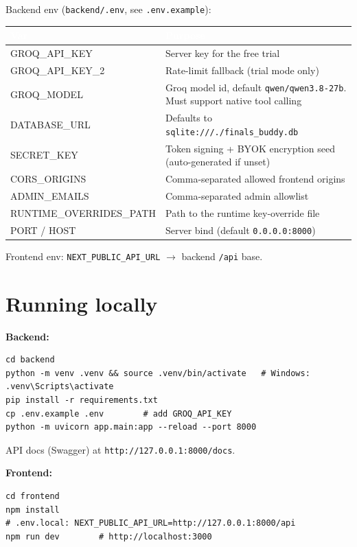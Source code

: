\documentclass[11pt,a4paper]{article}
\newcommand{\code}[1]{\colorbox{fbCream}{\texttt{\small #1}}}
\newcommand{\hdr}[1]{\textcolor{white}{\bfseries #1}}
\begin{document}
Backend env (\code{backend/.env}, see \code{.env.example}):

\begin{tabularx}{\textwidth}{>{\ttfamily}l L}
\toprule
{}\hdr{Var} & \hdr{Purpose} \\
\midrule
GROQ\_API\_KEY   & Server key for the free trial \\
GROQ\_API\_KEY\_2 & Rate-limit fallback (trial mode only) \\
GROQ\_MODEL      & Groq model id, default \code{qwen/qwen3.8-27b}. Must support
                   native tool calling \\
DATABASE\_URL    & Defaults to \code{sqlite:///./finals\_buddy.db} \\
SECRET\_KEY      & Token signing + BYOK encryption seed (auto-generated if unset) \\
CORS\_ORIGINS    & Comma-separated allowed frontend origins \\
ADMIN\_EMAILS    & Comma-separated admin allowlist \\
RUNTIME\_OVERRIDES\_PATH & Path to the runtime key-override file \\
PORT / HOST      & Server bind (default \code{0.0.0.0:8000}) \\
\bottomrule
\end{tabularx}

Frontend env: \code{NEXT\_PUBLIC\_API\_URL} $\rightarrow$ backend \code{/api} base.

\section{Running locally}

\textbf{Backend:}
\begin{lstlisting}
cd backend
python -m venv .venv && source .venv/bin/activate   # Windows: .venv\Scripts\activate
pip install -r requirements.txt
cp .env.example .env        # add GROQ_API_KEY
python -m uvicorn app.main:app --reload --port 8000
\end{lstlisting}
API docs (Swagger) at \code{http://127.0.0.1:8000/docs}.

\textbf{Frontend:}
\begin{lstlisting}
cd frontend
npm install
# .env.local: NEXT_PUBLIC_API_URL=http://127.0.0.1:8000/api
npm run dev        # http://localhost:3000
\end{lstlisting}

\end{document}
